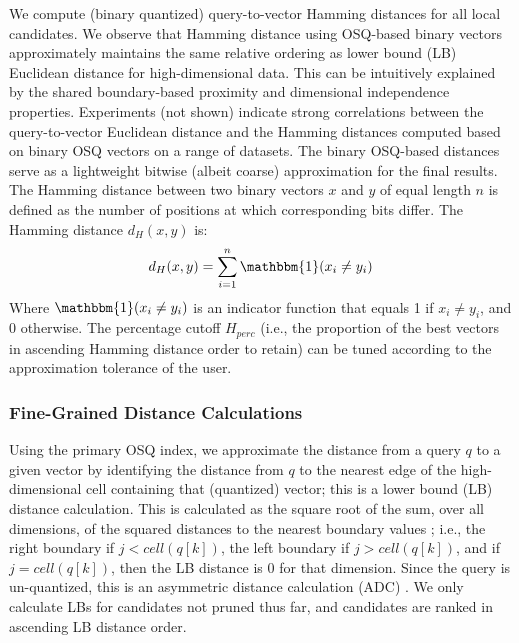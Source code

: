 We compute (binary quantized) query-to-vector Hamming distances for all local candidates. We observe that Hamming distance using OSQ-based binary vectors
approximately maintains the same relative ordering as lower bound (LB) Euclidean distance for high-dimensional data.
This can be intuitively explained by the shared boundary-based proximity and dimensional independence properties.
Experiments (not shown) indicate strong correlations between the query-to-vector Euclidean distance and the Hamming distances computed based on binary OSQ vectors on a range of datasets. 
The binary OSQ-based distances 
serve as a lightweight bitwise (albeit coarse) approximation for the final results.
The Hamming distance between two binary vectors $x$ and $y$ of equal length $n$ is defined as the number of positions at which corresponding bits differ. 
The Hamming distance $d_H(x, y)$ is:
\begin{equation}
    d_H(x, y) = \sum_{i=1}^{n} \mathbbm{1}(x_i \neq y_i)
    \label{eq-hamming-dist}
\end{equation}
Where $\mathbbm{1}(x_i \neq y_i)$ is an indicator function that equals 1 if $x_i \neq y_i$, and 0 otherwise.
The percentage cutoff $H_{perc}$ (i.e., the proportion of the best vectors in ascending Hamming distance order to retain) can be tuned according to the approximation tolerance of the user. 


\subsubsection{Fine-Grained Distance Calculations}
\label{sss:fine-grained-distance-cals}


Using the primary OSQ index, we approximate the distance from a query $q$ to a given vector by identifying the distance from $q$ to the nearest edge of the high-dimensional cell containing that (quantized) vector; this is a lower bound (LB) distance calculation.
This is calculated as the square root of the sum, over all dimensions, of the squared distances to the nearest boundary values \cite{Weber1998VA}; i.e., the right boundary if $j < cell(q[k])$, the left boundary if $j > cell(q[k])$, and if $j = cell(q[k])$, then the LB distance is 0 for that dimension.
Since the query is un-quantized, this is an asymmetric distance calculation (ADC) \cite{Jegou2011PQ}.
We only calculate LBs for candidates not pruned thus far, and candidates are ranked in ascending LB distance order.



